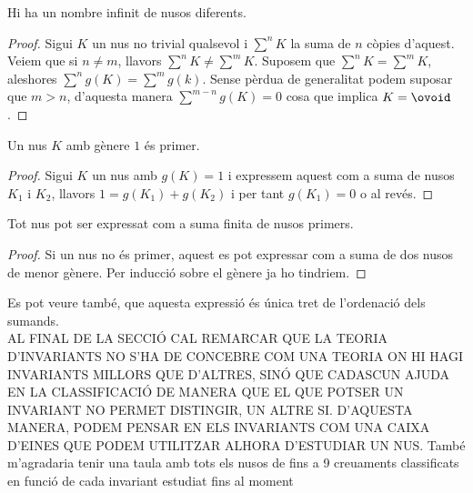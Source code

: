 \begin{corolary}
	Hi ha un nombre infinit de nusos diferents.
\end{corolary}

\begin{proof}
	Sigui $K$ un nus no trivial qualsevol i $\sum^{n}K$ la suma de $n$ còpies d'aquest. Veiem que si $n\neq m$, llavors $\sum^{n}K\neq\sum^{m}K$. Suposem que $\sum^{n}K=\sum^{m}K$, aleshores $\sum^{n}g(K)=\sum^{m}g(k)$. Sense pèrdua de generalitat podem suposar que $m>n$, d'aquesta manera $\sum^{m-n}g(K)=0$ cosa que implica $K=\ovoid$.
\end{proof}

\begin{corolary}
	Un nus $K$ amb gènere $1$ és primer.
\end{corolary}

\begin{proof}
	Sigui $K$ un nus amb $g(K)=1$ i expressem aquest com a suma de nusos $K_1$ i $K_2$, llavors $1=g(K_1)+g(K_2)$ i per tant $g(K_1)=0$ o al revés.
\end{proof}

\begin{corolary}
	Tot nus pot ser expressat com a suma finita de nusos primers.
\end{corolary}

\begin{proof}
	Si un nus no és primer, aquest es pot expressar com a suma de dos nusos de menor gènere. Per inducció sobre el gènere ja ho tindriem.
\end{proof}

Es pot veure també, que aquesta expressió és única tret de l'ordenació dels sumands.\\

AL FINAL DE LA SECCIÓ CAL REMARCAR QUE LA TEORIA D'INVARIANTS NO S'HA DE CONCEBRE COM UNA TEORIA ON HI HAGI INVARIANTS MILLORS QUE D'ALTRES, SINÓ QUE CADASCUN AJUDA EN LA CLASSIFICACIÓ DE MANERA QUE EL QUE POTSER UN INVARIANT NO PERMET DISTINGIR, UN ALTRE SI. D'AQUESTA MANERA, PODEM PENSAR EN ELS INVARIANTS COM UNA CAIXA D'EINES QUE PODEM UTILITZAR ALHORA D'ESTUDIAR UN NUS. També m'agradaria tenir una taula amb tots els nusos de fins a 9 creuaments classificats en funció de cada invariant estudiat fins al moment